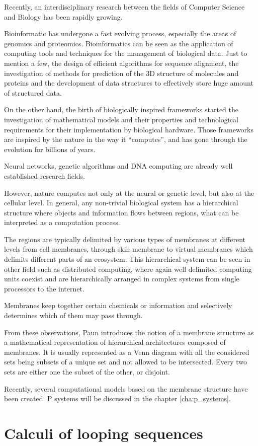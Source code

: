 Recently, an interdisciplinary research between the fields of Computer Science and Biology has been rapidly growing. 


Bioinformatic has undergone a fast evolving process, especially the areas of genomics and proteomics. Bioinformatics can be seen as the application of computing tools and techniques for the management of biological data. Just to mention a few, the design of efficient algorithms for sequence alignment, the investigation of methods for prediction of the 3D structure of molecules and proteins and the development of data structures to effectively store huge amount of structured data.


On the other hand, the birth of biologically inspired frameworks started the investigation of mathematical models and their properties and technological requirements for their implementation by biological hardware.
Those frameworks are inspired by the nature in the way it ``computes'', and has gone through the evolution for billions of years.

Neural networks, genetic algorithms and DNA computing are already well established research fields.

However, nature computes not only at the neural or genetic level, but also at the cellular level. In general, any non-trivial biological system has a hierarchical structure where objects and information flows between regions, what can be interpreted as a computation process.


The regions are typically delimited by various types of membranes at different levels from cell membranes, through skin membrane to virtual membranes which delimits different parts of an ecosystem.
This hierarchical system can be seen in other field such as distributed computing, where again well delimited computing units coexist and are hierarchically arranged in complex systems from single processors to the internet.

Membranes keep together certain chemicals or information and selectively determines which of them may pass through.


From these observations, Paun \cite{Paun98} introduces the notion of a membrane structure as a mathematical representation of hierarchical architectures composed of membranes. It is usually represented as a Venn diagram with all the considered sets being subsets of a unique set and not allowed to be intersected. Every two sets are either one the subset of the other, or disjoint.

Recently, several computational models based on the membrane structure have been created. P systems will be discussed in the chapter \ref{cha:p_systems}.

\section{Calculi of looping sequences} %
\label{sec:calculi_of_looping_sequences}



